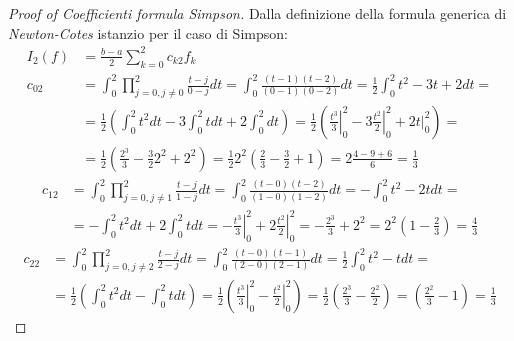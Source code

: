 \begin{proof}[Proof of Coefficienti formula Simpson]
Dalla definizione della formula generica di \emph{Newton-Cotes} istanzio per il
caso di Simpson:
\begin{displaymath}
\begin{split}
I_{2}(f) &= \frac{b-a}{2} \sum_{k = 0}^{2}{c_{k2}f_{k}} \\
c_{02} &= \int_{0}^{2}{\prod_{j=0,j\not = 0}^{2}{\frac{t-j}{0-j} dt}} = 
\int_{0}^{2}{\frac{(t-1)(t-2)}{(0-1)(0-2)}dt} = \frac{1}{2}\int_{0}^{2}{t^{2}
-3t +2 dt} = \\
&= \frac{1}{2}\left(\int_{0}^{2}{t^{2} dt} -3 \int_{0}^{2}{t dt} 
+ 2\int_{0}^{2}{dt}\right) = 
\frac{1}{2}\left(\left.\frac{t^{3}}{3}\right |_{0}^{2} -3 \left.\frac{t^{2}}{2}
\right |_{0}^{2} + 2\left.t\right |_{0}^{2}\right) = \\
&=  \frac{1}{2}\left(\frac{2^{3}}{3} - \frac{3}{2}2^{2} + 2^{2}\right) = 
\frac{1}{2} 2^{2} \left(\frac{2}{3} - \frac{3}{2} + 1\right) =
2\frac{4-9+6}{6} = \frac{1}{3}
\end{split}
\end{displaymath}
\begin{displaymath}
\begin{split}
c_{12} &= \int_{0}^{2}{\prod_{j=0,j\not = 1}^{2}{\frac{t-j}{1-j} dt}} = 
\int_{0}^{2}{\frac{(t-0)(t-2)}{(1-0)(1-2)}dt} = -\int_{0}^{2}{t^{2} -2t dt} = \\
&= -\int_{0}^{2}{t^{2} dt} +2 \int_{0}^{2}{t dt} = 
-\left.\frac{t^{3}}{3}\right |_{0}^{2} +2 \left.\frac{t^{2}}{2}
\right |_{0}^{2} =  -\frac{2^{3}}{3} + 2^{2} = 2^{2}\left(1 - \frac{2}{3}
\right) = \frac{4}{3}
\end{split}
\end{displaymath}
\begin{displaymath}
\begin{split}
c_{22} &= \int_{0}^{2}{\prod_{j=0,j\not = 2}^{2}{\frac{t-j}{2-j} dt}} = 
\int_{0}^{2}{\frac{(t-0)(t-1)}{(2-0)(2-1)}dt} = \frac{1}{2}\int_{0}^{2}{t^{2}
-t dt} = \\ 
&= \frac{1}{2}\left(\int_{0}^{2}{t^{2} dt} - \int_{0}^{2}{t dt}\right) = 
\frac{1}{2}\left(\left.\frac{t^{3}}{3}\right |_{0}^{2} - \left.\frac{t^{2}}{2}
\right |_{0}^{2}\right) = \frac{1}{2}\left(\frac{2^{3}}{3} - \frac{2^{2}}{2}
\right) = \left(\frac{2^{2}}{3} - 1 \right) = \frac{1}{3}
\end{split}
\end{displaymath}
\end{proof}

